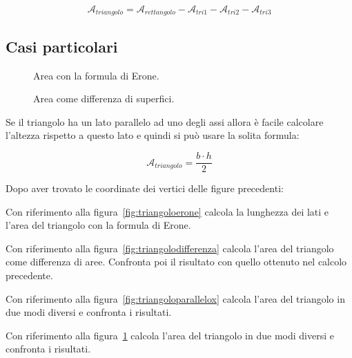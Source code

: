 \[\mathcal{A}_{triangolo} = \mathcal{A}_{rettangolo}-\mathcal{A}_{tri1}
                                                    -\mathcal{A}_{tri2}
                                                    -\mathcal{A}_{tri3}\]

\subsection*{Casi particolari}

\begin{inaccessibleblock}
 \begin{figure}[h]
 \centering
 \begin{minipage}[t]{.45\textwidth}
  \centering
  \caption{Area con la formula di Erone.}\label{fig:triangoloparallelox}
 \end{minipage}\hfil
 \begin{minipage}[t]{.45\textwidth}
  \centering
  \caption{Area come differenza di superfici.}\label{fig:triangoloparalleloy}
 \end{minipage}\hfil
\end{figure}
\end{inaccessibleblock}

Se il triangolo ha un lato parallelo ad uno degli assi allora è facile 
calcolare l'altezza rispetto a questo lato e quindi si può usare la 
solita formula:

\[\mathcal{A}_{triangolo} = \frac{b \cdot h}{2}\]

\begin{exrig}
 Dopo aver trovato le coordinate dei vertici delle figure precedenti:

 \begin{esempio}
 \label{ex:D.18}
  Con riferimento alla figura~\ref{fig:triangoloerone} calcola 
  la lunghezza dei lati e l'area del triangolo con la formula di Erone.
 \end{esempio}

 \begin{esempio}
  Con riferimento alla figura~\ref{fig:triangolodifferenza} calcola 
  l'area del triangolo come differenza di aree.
  Confronta poi il risultato con quello ottenuto nel calcolo precedente.
 \end{esempio}

 \begin{esempio}
  Con riferimento alla figura~\ref{fig:triangoloparallelox} calcola 
  l'area del triangolo in due modi diversi e confronta i risultati.
 \end{esempio}

 \begin{esempio}
  Con riferimento alla figura~\ref{fig:triangoloparalleloy} calcola 
  l'area del triangolo in due modi diversi e confronta i risultati.
 \end{esempio}
\end{exrig}

% 
